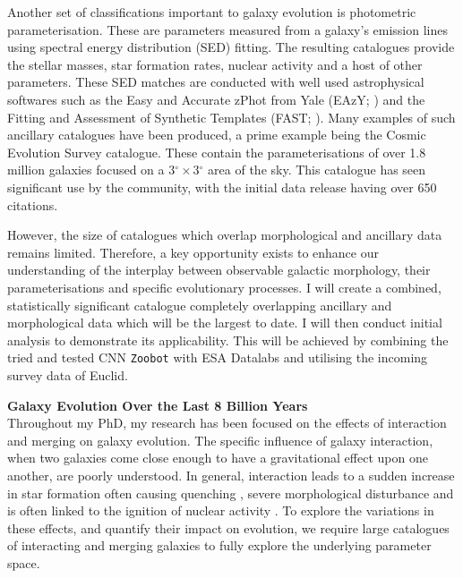 \documentclass[11pt]{article}
\begin{document}
Another set of classifications important to galaxy evolution is photometric parameterisation. These are parameters measured from a galaxy's emission lines using spectral energy distribution (SED) fitting. The resulting catalogues provide the stellar masses, star formation rates, nuclear activity and a host of other parameters. These SED matches are conducted with well used astrophysical softwares such as the Easy and Accurate zPhot from Yale (EAzY; \citet{2008ApJ...686.1503B}) and the Fitting and Assessment of Synthetic Templates (FAST; \citet{2009ApJ...700..221K}). Many examples of such ancillary catalogues have been produced, a prime example being the Cosmic Evolution Survey \citep[COSMOS; ][]{2007ApJS..172...99C} catalogue. These contain the parameterisations of over 1.8 million galaxies focused on a 3$^{\circ} \times $3$^{\circ}$ area of the sky. This catalogue has seen significant use by the community, with the initial data release having over 650 citations.

However, the size of catalogues which overlap morphological and ancillary data remains limited. Therefore, a key opportunity exists to enhance our understanding of the interplay between observable galactic morphology, their parameterisations and specific evolutionary processes. I will create a combined, statistically significant catalogue completely overlapping ancillary and morphological data which will be the largest to date. I will then conduct initial analysis to demonstrate its applicability. This will be achieved by combining the tried and tested CNN \texttt{Zoobot} with ESA Datalabs and utilising the incoming survey data of Euclid.

\vspace{-5mm}
\impact
\vspace{-3mm}
\noindent \textbf{Galaxy Evolution Over the Last 8 Billion Years} \\
\noindent Throughout my PhD, my research has been focused on the effects of interaction and merging on galaxy evolution. The specific influence of galaxy interaction, when two galaxies come close enough to have a gravitational effect upon one another, are poorly understood. In general, interaction leads to a sudden increase in star formation \citep{2021MNRAS.503.3113M} often causing quenching \citep{2023RAA....23b5016D}, severe morphological disturbance \citep{1972ApJ...178..623T} and is often linked to the ignition of nuclear activity \citep{2015ApJ...806..219C}. To explore the variations in these effects, and quantify their impact on evolution, we require large catalogues of interacting and merging galaxies to fully explore the underlying parameter space.
\end{document}
